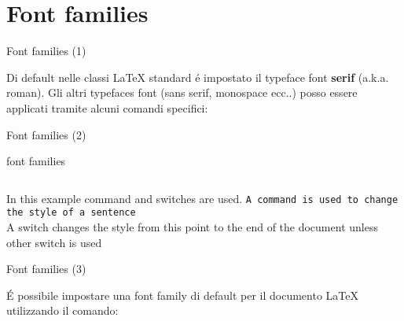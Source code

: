 \section{Font families}

\begin{frame}{Font families (1)}
    
    Di default nelle classi \LaTeX{} standard é impostato il typeface font \textbf{serif} (a.k.a. roman). Gli altri typefaces font (sans serif, monospace ecc..) posso essere applicati tramite alcuni comandi specifici:
    
\end{frame}    

\begin{frame}{Font families (2)}
    
    \begin{esempio}{font families}
           \inputminted[linenos,fontsize=\small]{latex}{res/examples/font_families.tex}
    \end{esempio}
    
    \pause
    \vspace{5mm}
    
    In this example command and switches are used. 
    \texttt{A command is used to change the style 
    of a sentence}\\
     
    \rmfamily
    A switch changes the style from this point to 
    the end of the document unless other switch is used
    \sffamily

\end{frame}

\begin{frame}{Font families (3)}

    É possibile impostare una font family di default per il documento \LaTeX{} utilizzando il comando:
    \texttt{\renewcommand{\familydefault}{\sfdefault}}

\end{frame}